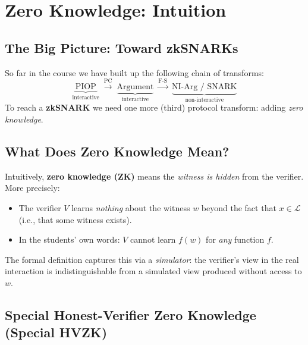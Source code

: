 \documentclass[11pt]{article}
\theoremstyle{plain}
\theoremstyle{definition}
\begin{document}
\section{Zero Knowledge: Intuition}

\subsection{The Big Picture: Toward zkSNARKs}

So far in the course we have built up the following chain of transforms:
\[
  \underbrace{\text{PIOP}}_{\text{interactive}}
  \;\xrightarrow{\text{PC}}\;
  \underbrace{\text{Argument}}_{\text{interactive}}
  \;\xrightarrow{\text{F-S}}\;
  \underbrace{\text{NI-Arg / SNARK}}_{\text{non-interactive}}
\]
To reach a \textbf{zkSNARK} we need one more (third) protocol transform: adding
\emph{zero knowledge}.

\subsection{What Does Zero Knowledge Mean?}

Intuitively, \textbf{zero knowledge (ZK)} means the \emph{witness is hidden}
from the verifier.  More precisely:

\begin{itemize}
  \item The verifier $V$ learns \emph{nothing} about the witness $w$ beyond the
        fact that $x \in \mathcal{L}$ (i.e., that some witness exists).
  \item In the students' own words: $V$ cannot learn $f(w)$ for \emph{any}
        function $f$.
\end{itemize}

\noindent The formal definition captures this via a \emph{simulator}: the
verifier's view in the real interaction is indistinguishable from a simulated
view produced without access to $w$.

\subsection{Special Honest-Verifier Zero Knowledge (Special HVZK)}
\end{document}
